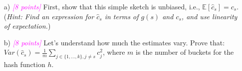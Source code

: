 \documentclass{exam}
\newcommand{\E}{\mathbb{E}}
\newcommand{\grade}[1]{\small\textcolor{magenta}{\emph{[#1 points]}} \normalsize}
\newcommand{\sol}[1]{\ifshowsolutions{\leavevmode{\color{blue}Solution: #1}}\fi}
\newif\ifshowsolutions
\begin{document}
\begin{itemize}

\item[{a)}] \grade{8} First, show that this simple sketch is unbiased, i.e., $\E[\hat{c}_s] = c_s$. (\textit{Hint: Find an expression for $\hat{c}_s$ in terms of $g(s)$ and $c_s$, and use linearity of expectation.})  \\

\sol{
Let $Y_x$ be an indicator variable, which is $1$ if a collision occurs, i.e., $h(x) = h(s)$, and 0 otherwise.
\begin{align*}
    \E[\hat{c}_s] &= \E[C[h(s)] g(s)] \\
    & = \E \left[\sum_{x \in \{1, \dots, k\}} Y_x c_x g(x) g(s)\right] \\
    & = \E \left[\sum_{x \neq s} Y_x c_x g(x) g(s) + c_s g(s) g(s)\right] \\
    & = \E \left[\sum_{x \neq s} Y_x c_x g(x) g(s) + c_s\right] \\
    & = \sum_{x \in X, x \neq s} c_x \E[g(x)Y_x]\E[g(s)]  + c_s \\
    & = 0 + c_s  \\
    & = c_s
\end{align*}
}

\newpage
\item[{b)}] \grade{8} Let's understand how much the estimates vary. Prove that: $Var(\hat{c}_s) = \frac{1}{m}\sum_{j \in \{1, \dots, k\}, j \neq s} c_j^2$, where $m$ is the number of buckets for the hash function $h$.

\sol{
\begin{align*}
    Var(\hat{c}_s) & = \E[(\hat{c}_s - \E[\hat{c}_s])^2] \\
    & = \E\left[\left(\sum_{ x \neq s} Y_x c_x g(x) g(s) + c_s - c_s\right)^2 \right] \\
    & = \E\left[\left(\sum_{ x \neq s} Y_x c_x g(x) g(s)\right)^2 \right] \\
    & = \E\left[\sum_{x \neq s}\sum_{x' \neq s} Y_x Y_{x'} c_x c_{x'} g(x) g(x')\right] \\
    & = \sum_{x \neq s}\sum_{x' \neq s} c_x c_{x'} \E[Y_x Y_{x'}g(x) g(x')] \\
    & = \sum_{x\neq s} c_x^2 \E[Y_x^2] \\
    & = \frac{1}{m} \sum_{x\neq s} c_x^2
\end{align*}
}


\end{itemize}
\end{document}

